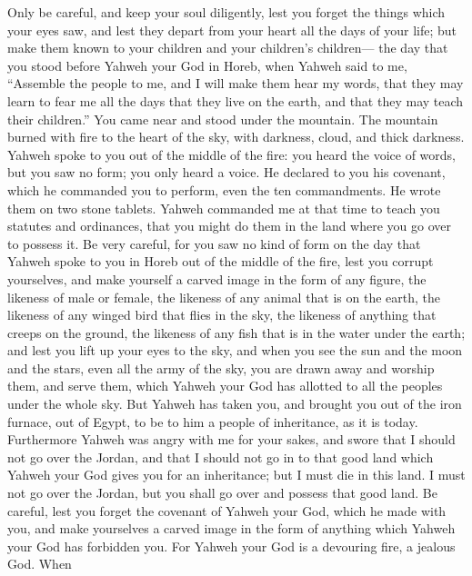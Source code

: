  Only be careful, and keep your soul diligently, lest you
forget the things which your eyes saw, and lest they depart from your
heart all the days of your life; but make them known to your children
and your children's children---  the day that you stood
before Yahweh your God in Horeb, when Yahweh said to me, ``Assemble the
people to me, and I will make them hear my words, that they may learn to
fear me all the days that they live on the earth, and that they may
teach their children.''  You came near and stood under the
mountain. The mountain burned with fire to the heart of the sky, with
darkness, cloud, and thick darkness.  Yahweh spoke to you
out of the middle of the fire: you heard the voice of words, but you saw
no form; you only heard a voice.  He declared to you his
covenant, which he commanded you to perform, even the ten commandments.
He wrote them on two stone tablets.  Yahweh commanded me at
that time to teach you statutes and ordinances, that you might do them
in the land where you go over to possess it.  Be very
careful, for you saw no kind of form on the day that Yahweh spoke to you
in Horeb out of the middle of the fire,  lest you corrupt
yourselves, and make yourself a carved image in the form of any figure,
the likeness of male or female,  the likeness of any animal
that is on the earth, the likeness of any winged bird that flies in the
sky,  the likeness of anything that creeps on the ground,
the likeness of any fish that is in the water under the earth;
 and lest you lift up your eyes to the sky, and when you
see the sun and the moon and the stars, even all the army of the sky,
you are drawn away and worship them, and serve them, which Yahweh your
God has allotted to all the peoples under the whole sky. 
But Yahweh has taken you, and brought you out of the iron furnace, out
of Egypt, to be to him a people of inheritance, as it is today.
 Furthermore Yahweh was angry with me for your sakes, and
swore that I should not go over the Jordan, and that I should not go in
to that good land which Yahweh your God gives you for an inheritance;
 but I must die in this land. I must not go over the
Jordan, but you shall go over and possess that good land. 
Be careful, lest you forget the covenant of Yahweh your God, which he
made with you, and make yourselves a carved image in the form of
anything which Yahweh your God has forbidden you.  For
Yahweh your God is a devouring fire, a jealous God.  When
